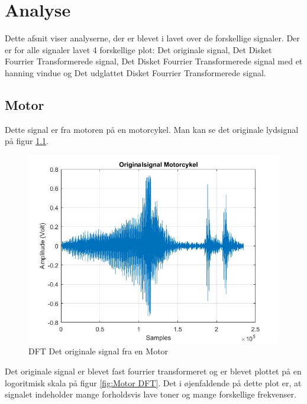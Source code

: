 \chapter{Analyse}\label{ch:analyse}
Dette afsnit viser analyserne, der er blevet i lavet over de forskellige signaler. Der er for alle signaler lavet 4 forskellige plot: Det originale signal, Det Disket Fourrier Transformerede signal, Det Disket Fourrier Transformerede signal med et hanning vindue og Det udglattet Disket Fourrier Transformerede signal.


\section{Motor}
Dette signal er fra motoren på en motorcykel. Man kan se det originale lydsignal på figur \ref{fig:Motor original}.
\begin{figure}[H]
	\centering
	\includegraphics[width=120mm]{figures/Motor/original.jpg}
	\caption{DFT Det originale signal fra en Motor}
	\label{fig:Motor original}
\end{figure}

Det originale signal er blevet fast fourrier transformeret og er blevet plottet på en logoritmisk skala på figur \ref{fig:Motor DFT}. Det i øjenfaldende på dette plot er, at signalet indeholder mange forholdsvis lave toner og  mange forskellige frekvenser.

